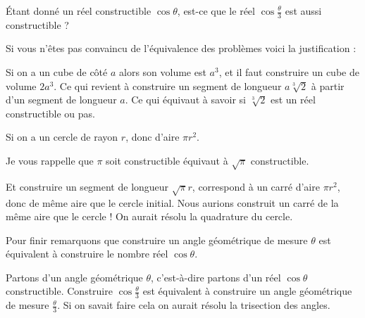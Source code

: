   \'Etant donné un réel 
  constructible $\cos \theta$, est-ce que le réel $\cos \frac\theta3$ est aussi constructible ?

  \change
Si vous n'êtes pas convaincu de l'équivalence des problèmes voici la justification :

Si on a un cube de côté $a$ alors son volume est $a^3$, et il faut construire 
  un cube de volume $2a^3$.
  Ce qui revient à construire un segment de longueur $a\sqrt[3]{2}$ à partir d'un segment de longueur $a$.
  Ce qui équivaut à savoir si $\sqrt[3]{2}$ est un réel constructible ou pas.
  
  \change
  
  Si on a un cercle de rayon $r$, donc d'aire $\pi r^2$. 
  
  Je vous rappelle que $\pi$ soit constructible équivaut à $\sqrt\pi$ constructible. 
  
  Et construire un segment de longueur $\sqrt\pi r$,
  correspond à un carré d'aire $\pi r^2$, donc de même aire que le cercle initial.
  Nous aurions construit un carré de la même aire que le cercle !
  On aurait résolu la quadrature du cercle.


\diapo

Pour finir remarquons que construire un angle géométrique de mesure $\theta$
est équivalent à construire le nombre réel $\cos \theta$.
  
\change
  
  Partons d'un angle géométrique $\theta$, c'est-à-dire partons d'un réel
  $\cos \theta$ constructible. Construire $\cos \frac\theta3$
  est équivalent à construire un angle géométrique de mesure $\frac\theta 3$.
  Si on savait faire cela on aurait résolu la trisection des angles.


